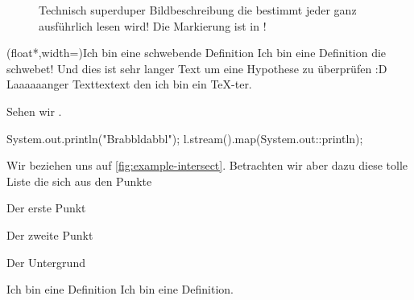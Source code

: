 \documentclass[userip,ngerman]{lecture-digital}
\begin{document}
\Blindtext[1]
\begin{figure}
    \centering{}
    \caption{Technisch superduper Bildbeschreibung die bestimmt jeder ganz ausführlich lesen wird! Die Markierung ist in \tikzAname!}
    \label{fig:example-intersect}
\end{figure}
\begin{definition}(float*,width=\textwidth){Ich bin eine schwebende Definition}
    \label{def:floatingdef}Ich bin eine Definition die schwebet! Und dies ist sehr langer Text um eine Hypothese zu überprüfen :D Laaaaaanger Texttextext den ich bin ein \TeX-ter.
\end{definition}
\Blindtext[2]
Sehen wir .
\begin{java*}
System.out.println("Brabbldabbl");
l.stream().map(System.out::println);
\end{java*}
Wir beziehen uns auf \autoref{fig:example-intersect}. Betrachten wir aber dazu diese tolle Liste die sich aus den Punkte \begin{inlist}
    \item Der erste Punkt
    \item Der zweite Punkt
    \item Der Untergrund
\end{inlist}
\Blindtext[2]
\begin{definition}{Ich bin eine Definition}
    Ich bin eine Definition.
\end{definition}
\end{document}
